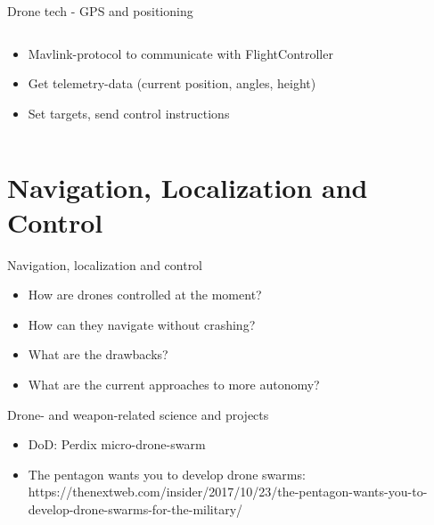 \documentclass[aspectratio=169]{beamer}
\begin{document}
\begin{frame}{Drone tech - GPS and positioning}
\begin{columns}
	\begin{column}{.74\textwidth}
		\begin{itemize}
			\item Mavlink-protocol to communicate with FlightController
			\item Get telemetry-data (current position, angles, height)
			\item Set targets, send control instructions
		\end{itemize}
	\end{column}
	
	\end{columns}
\end{frame}


\section{Navigation, Localization and Control}

\begin{frame}{Navigation, localization and control}
	\begin{itemize}
		\item How are drones controlled at the moment?
		\item How can they navigate without crashing?
		\item What are the drawbacks?
		\item What are the current approaches to more autonomy?
	\end{itemize}
\end{frame}

\begin{frame}{Drone- and weapon-related science and projects}
	\begin{itemize}
		\item DoD: Perdix micro-drone-swarm
        \item The pentagon wants you to develop drone swarms: https://thenextweb.com/insider/2017/10/23/the-pentagon-wants-you-to-develop-drone-swarms-for-the-military/
	\end{itemize}
\end{frame}
\end{document}
